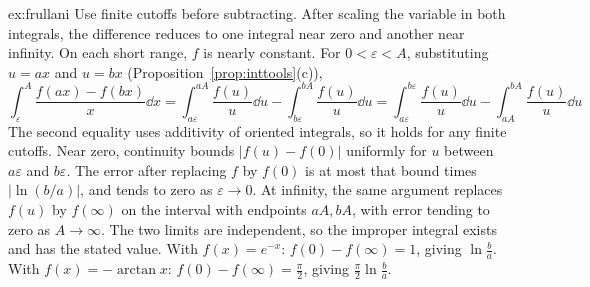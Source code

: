 \begin{solution}{ex:frullani}
\idea Use finite cutoffs before subtracting. After scaling the variable in both integrals, the difference reduces to one integral near zero and another near infinity. On each short range, $f$ is nearly constant.
\writeup For $0<\varepsilon<A$, substituting $u=ax$ and $u=bx$ (Proposition~\ref{prop:inttools}(c)),
\[
\int_\varepsilon^A\frac{f(ax)-f(bx)}x\dd x=\int_{a\varepsilon}^{aA}\frac{f(u)}u\dd u-\int_{b\varepsilon}^{bA}\frac{f(u)}u\dd u=\int_{a\varepsilon}^{b\varepsilon}\frac{f(u)}u\dd u-\int_{aA}^{bA}\frac{f(u)}u\dd u
\]
The second equality uses additivity of oriented integrals, so it holds for any finite cutoffs. Near zero, continuity bounds $|f(u)-f(0)|$ uniformly for $u$ between $a\varepsilon$ and $b\varepsilon$. The error after replacing $f$ by $f(0)$ is at most that bound times $|\ln(b/a)|$, and tends to zero as $\varepsilon\to0$. At infinity, the same argument replaces $f(u)$ by $f(\infty)$ on the interval with endpoints $aA,bA$, with error tending to zero as $A\to\infty$. The two limits are independent, so the improper integral exists and has the stated value.
With $f(x)=e^{-x}$: $f(0)-f(\infty)=1$, giving $\ln\frac ba$. With $f(x)=-\arctan x$: $f(0)-f(\infty)=\frac\pi2$, giving $\frac\pi2\ln\frac ba$.
\end{solution}

